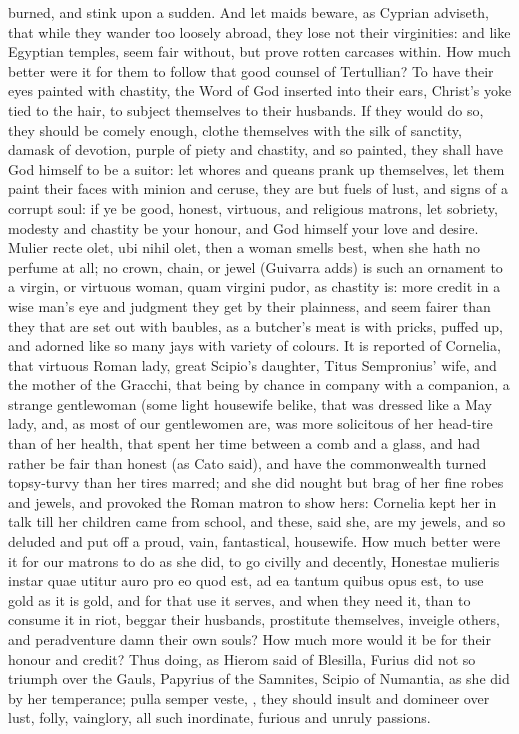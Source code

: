{burned, and stink upon a sudden. And let maids beware, as Cyprian
adviseth, that while they wander too loosely abroad, they lose not
their virginities: and like Egyptian temples, seem fair without, but
prove rotten carcases within. How much better were it for them to
follow that good counsel of Tertullian? To have their eyes
painted with chastity, the Word of God inserted into their ears,
Christ's yoke tied to the hair, to subject themselves to their
husbands. If they would do so, they should be comely enough, clothe
themselves with the silk of sanctity, damask of devotion, purple of
piety and chastity, and so painted, they shall have God himself to be a
suitor: let whores and queans prank up themselves, let them paint
their faces with minion and ceruse, they are but fuels of lust, and
signs of a corrupt soul: if ye be good, honest, virtuous, and religious
matrons, let sobriety, modesty and chastity be your honour, and God
himself your love and desire. Mulier recte olet, ubi nihil olet, then a
woman smells best, when she hath no perfume at all; no crown, chain, or
jewel (Guivarra adds) is such an ornament to a virgin, or virtuous
woman, quam virgini pudor, as chastity is: more credit in a wise man's
eye and judgment they get by their plainness, and seem fairer than they
that are set out with baubles, as a butcher's meat is with pricks,
puffed up, and adorned like so many jays with variety of colours. It is
reported of Cornelia, that virtuous Roman lady, great Scipio's
daughter, Titus Sempronius' wife, and the mother of the Gracchi, that
being by chance in company with a companion, a strange gentlewoman
(some light housewife belike, that was dressed like a May lady, and, as
most of our gentlewomen are, was more solicitous of her head-tire
than of her health, that spent her time between a comb and a glass, and
had rather be fair than honest (as Cato said), and have the
commonwealth turned topsy-turvy than her tires marred; and she did
nought but brag of her fine robes and jewels, and provoked the Roman
matron to show hers: Cornelia kept her in talk till her children came
from school, and these, said she, are my jewels, and so deluded and put
off a proud, vain, fantastical, housewife. How much better were it for
our matrons to do as she did, to go civilly and decently,
Honestae mulieris instar quae utitur auro pro eo quod est, ad ea
tantum quibus opus est, to use gold as it is gold, and for that use it
serves, and when they need it, than to consume it in riot, beggar their
husbands, prostitute themselves, inveigle others, and peradventure damn
their own souls? How much more would it be for their honour and credit?
Thus doing, as Hierom said of Blesilla, Furius did not so triumph
over the Gauls, Papyrius of the Samnites, Scipio of Numantia, as she
did by her temperance; pulla semper veste, \etc{}, they should insult and
domineer over lust, folly, vainglory, all such inordinate, furious and
unruly passions.

}

